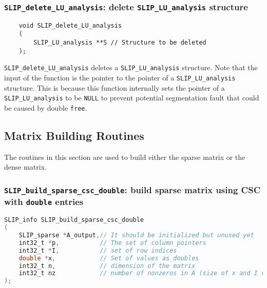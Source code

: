 \documentclass[11pt]{article}
\theoremstyle{definition}
\begin{document}

\cprotect\subsubsection{\verb|SLIP_delete_LU_analysis|: delete \verb|SLIP_LU_analysis| structure}
\label{ss:delete_LU_analysis}

\begin{mdframed}[userdefinedwidth=6in]
{\footnotesize
\begin{verbatim}
    void SLIP_delete_LU_analysis
    (
        SLIP_LU_analysis **S // Structure to be deleted
    );
\end{verbatim}
} \end{mdframed}


\verb|SLIP_delete_LU_analysis| deletes a \verb|SLIP_LU_analysis| structure.
Note that the input of the function is the pointer to the pointer of a
\verb|SLIP_LU_analysis| structure. This is because this function internally
sets the pointer of a \verb|SLIP_LU_analysis| to be \verb|NULL| to prevent
potential segmentation fault that could be caused by double \verb|free|.

\subsection{Matrix Building Routines} \label{s:Matrix_building_routines}

The routines in this section are used to build either the sparse matrix or the
dense matrix.


\cprotect\subsubsection{\verb|SLIP_build_sparse_csc_double|: build sparse matrix using CSC with \verb|double| entries}\label{s:user:build_sparse_csc_double}
\begin{lstlisting}[language=C,frame=single]
SLIP_info SLIP_build_sparse_csc_double
(
    SLIP_sparse *A_output,// It should be initialized but unused yet
    int32_t *p,           // The set of column pointers
    int32_t *I,           // set of row indices
    double *x,            // Set of values as doubles
    int32_t n,            // dimension of the matrix
    int32_t nz            // number of nonzeros in A (size of x and I vectors)
);
\end{lstlisting}
\end{document}
